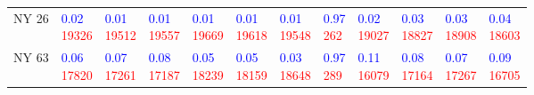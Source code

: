 \begin{tabular}{llllllllllll}
NY 26 & \makecell{\textcolor{blue}{0.02} \\ \textcolor{red}{19326}} & \makecell{\textcolor{blue}{0.01} \\ \textcolor{red}{19512}} & \makecell{\textcolor{blue}{0.01} \\ \textcolor{red}{19557}} & \makecell{\textcolor{blue}{0.01} \\ \textcolor{red}{19669}} & \makecell{\textcolor{blue}{0.01} \\ \textcolor{red}{19618}} & \makecell{\textcolor{blue}{0.01} \\ \textcolor{red}{19548}} & \makecell{\textcolor{blue}{0.97} \\ \textcolor{red}{262}} & \makecell{\textcolor{blue}{0.02} \\ \textcolor{red}{19027}} & \makecell{\textcolor{blue}{0.03} \\ \textcolor{red}{18827}} & \makecell{\textcolor{blue}{0.03} \\ \textcolor{red}{18908}} & \makecell{\textcolor{blue}{0.04} \\ \textcolor{red}{18603}} \\
NY 63 & \makecell{\textcolor{blue}{0.06} \\ \textcolor{red}{17820}} & \makecell{\textcolor{blue}{0.07} \\ \textcolor{red}{17261}} & \makecell{\textcolor{blue}{0.08} \\ \textcolor{red}{17187}} & \makecell{\textcolor{blue}{0.05} \\ \textcolor{red}{18239}} & \makecell{\textcolor{blue}{0.05} \\ \textcolor{red}{18159}} & \makecell{\textcolor{blue}{0.03} \\ \textcolor{red}{18648}} & \makecell{\textcolor{blue}{0.97} \\ \textcolor{red}{289}} & \makecell{\textcolor{blue}{0.11} \\ \textcolor{red}{16079}} & \makecell{\textcolor{blue}{0.08} \\ \textcolor{red}{17164}} & \makecell{\textcolor{blue}{0.07} \\ \textcolor{red}{17267}} & \makecell{\textcolor{blue}{0.09} \\ \textcolor{red}{16705}} \\

\end{tabular}
